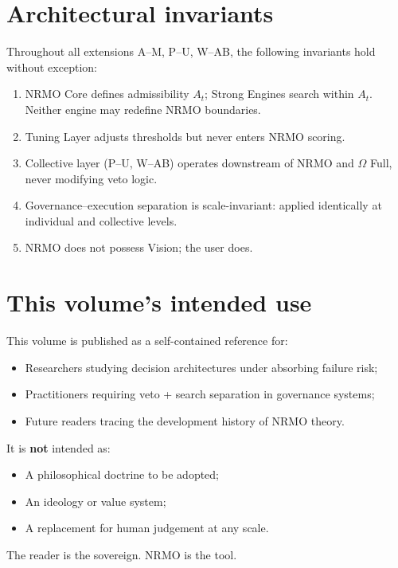 \section*{Architectural invariants}

Throughout all extensions A--M, P--U, W--AB, the following invariants
hold without exception:

\begin{enumerate}
\item NRMO Core defines admissibility $A_t$; Strong Engines search
  within $A_t$. Neither engine may redefine NRMO boundaries.
\item Tuning Layer adjusts thresholds but never enters NRMO scoring.
\item Collective layer (P--U, W--AB) operates downstream of NRMO and
  $\Omega$ Full, never modifying veto logic.
\item Governance--execution separation is scale-invariant: applied
  identically at individual and collective levels.
\item NRMO does not possess Vision; the user does.
\end{enumerate}

\section*{This volume's intended use}

This volume is published as a self-contained reference for:
\begin{itemize}
\item Researchers studying decision architectures under absorbing
  failure risk;
\item Practitioners requiring veto + search separation in governance
  systems;
\item Future readers tracing the development history of NRMO theory.
\end{itemize}

It is \textbf{not} intended as:
\begin{itemize}
\item A philosophical doctrine to be adopted;
\item An ideology or value system;
\item A replacement for human judgement at any scale.
\end{itemize}

The reader is the sovereign. NRMO is the tool.

